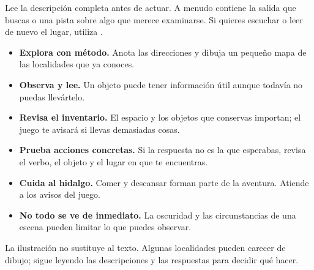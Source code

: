 Lee la descripción completa antes de actuar. A menudo contiene la salida que buscas o una pista sobre algo que merece examinarse. Si quieres escuchar o leer de nuevo el lugar, utiliza .

\begin{itemize}
\item \textbf{Explora con método.} Anota las direcciones y dibuja un pequeño mapa de las localidades que ya conoces.
\item \textbf{Observa y lee.} Un objeto puede tener información útil aunque todavía no puedas llevártelo.
\item \textbf{Revisa el inventario.} El espacio y los objetos que conservas importan; el juego te avisará si llevas demasiadas cosas.
\item \textbf{Prueba acciones concretas.} Si la respuesta no es la que esperabas, revisa el verbo, el objeto y el lugar en que te encuentras.
\item \textbf{Cuida al hidalgo.} Comer y descansar forman parte de la aventura. Atiende a los avisos del juego.
\item \textbf{No todo se ve de inmediato.} La oscuridad y las circunstancias de una escena pueden limitar lo que puedes observar.
\end{itemize}

\begin{center}\end{center}


La ilustración no sustituye al texto. Algunas localidades pueden carecer de dibujo; sigue leyendo las descripciones y las respuestas para decidir qué hacer.


